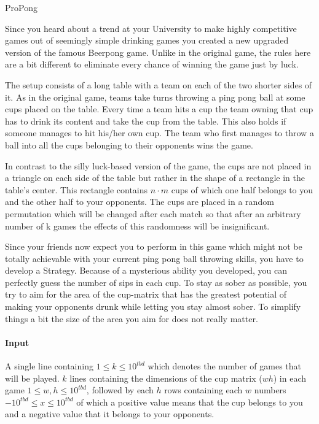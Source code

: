



\makeheader

ProPong

Since you heard about a trend at your University to make highly competitive games out of seemingly simple drinking games you created a new upgraded version of the famous Beerpong game. Unlike in the original game, the rules here are a bit different to eliminate every chance of winning the game just by luck. 

The setup consists of a long table with a team on each of the two shorter sides of it. As in the original game, teams take turns throwing a ping pong ball at some cups placed on the table. Every time a team hits a cup the team owning that cup has to drink its content and take the cup from the table. This also holds if someone manages to hit his/her own cup. The team who first manages to throw a ball into all the cups belonging to their opponents wins the game. 

In contrast to the silly luck-based version of the game, the cups are not placed in a triangle on each side of the table but rather in the shape of a rectangle in the table's center. This rectangle contains  $n \cdot m$ cups of which one half belongs to you and the other half to your opponents. The cups are placed in a random permutation which will be changed after each match so that after an arbitrary number of k games the effects of this randomness will be insignificant. 

Since your friends now expect you to perform in this game which might not be totally achievable with your current ping pong ball throwing skills, you have to develop a Strategy. Because of a mysterious ability you developed, you can perfectly guess the number of sips in each cup. To stay as sober as possible, you try to aim for the area of the cup-matrix that has the greatest potential of making your opponents drunk while letting you stay almost sober. To simplify things a bit the size of the area you aim for does not really matter.


\paragraph*{Input}

A single line containing $1\leq k \leq 10^{tbd}$  which denotes the number of games that will be played.
$k$ lines containing the dimensions of the cup matrix ($w h$) in each game $1 \leq w,h \leq 10^{tbd}$, followed by each $h$ rows containing each $w$ numbers $-10^{tbd} \leq x \leq 10^{tbd}$ of which a positive value means that the cup belongs to you and a negative value that it belongs to your opponents.

